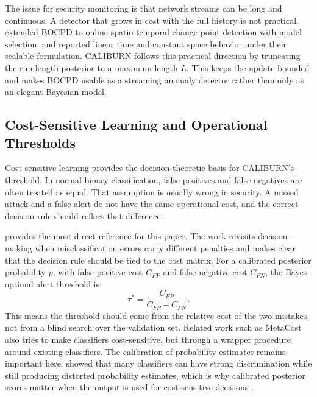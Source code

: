 \documentclass[preprint,12pt,authoryear]{elsarticle}
\newcommand{\caliburn}{CALIBURN}
\begin{document}
The issue for security monitoring is that network streams can be long and continuous. A detector that grows in cost with the full history is not practical. \citet{knoblauch2018spatio} extended BOCPD to online spatio-temporal change-point detection with model selection, and \citet{knoblauch2018doubly} reported linear time and constant space behavior under their scalable formulation. \caliburn{} follows this practical direction by truncating the run-length posterior to a maximum length $L$. This keeps the update bounded and makes BOCPD usable as a streaming anomaly detector rather than only as an elegant Bayesian model.

\subsection{Cost-Sensitive Learning and Operational Thresholds}
\label{sec:bg-cost}

Cost-sensitive learning provides the decision-theoretic basis for \caliburn{}'s threshold. In normal binary classification, false positives and false negatives are often treated as equal. That assumption is usually wrong in security. A missed attack and a false alert do not have the same operational cost, and the correct decision rule should reflect that difference.

\citet{elkan2001foundations} provides the most direct reference for this paper. The work revisits decision-making when misclassification errors carry different penalties and makes clear that the decision rule should be tied to the cost matrix. For a calibrated posterior probability $p$, with false-positive cost $C_{FP}$ and false-negative cost $C_{FN}$, the Bayes-optimal alert threshold is:
\begin{equation}
    \tau^{*} = \frac{C_{FP}}{C_{FP} + C_{FN}}.
    \label{eq:elkan-threshold}
\end{equation}
This means the threshold should come from the relative cost of the two mistakes, not from a blind search over the validation set. Related work such as MetaCost \citep{domingos1999metacost} also tries to make classifiers cost-sensitive, but through a wrapper procedure around existing classifiers. The calibration of probability estimates remains important here. \citet{niculescu2005predicting} showed that many classifiers can have strong discrimination while still producing distorted probability estimates, which is why calibrated posterior scores matter when the output is used for cost-sensitive decisions \citep{zadrozny2002transforming}.
\end{document}

